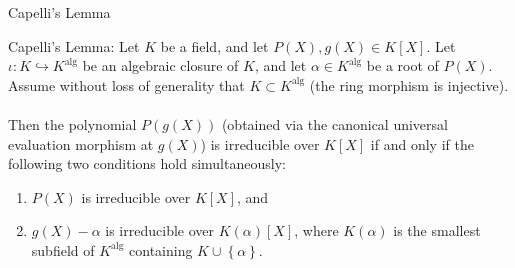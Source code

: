 \begin{appendixitem}{Capelli's Lemma}
    \begin{lemma}{Capelli's Lemma:}
        Let \( K \) be a field, and let \( P\left(X\right), g\left(X\right) \in K\left[X\right] \). Let \( \iota:K \hookrightarrow K^{\text{alg}} \) be an algebraic closure of \( K \), and let \( \alpha \in K^{\text{alg}} \) be a root of \( P\left(X\right) \). Assume without loss of generality that \( K\subset K^{\text{alg}} \) (the ring morphism is injective).
        \\\\
        Then the polynomial \( P\left( g\left(X\right) \right) \) (obtained via the canonical universal evaluation morphism at \( g\left(X\right) \)) is irreducible over \( K\left[X\right] \) if and only if the following two conditions hold simultaneously:
        \begin{enumerate}
            \item \( P\left(X\right) \) is irreducible over \( K\left[X\right] \), and
            \item \( g\left(X\right) - \alpha \) is irreducible over \( K\left(\alpha\right)\left[X\right] \), where \( K\left(\alpha\right) \) is the smallest subfield of \( K^{\text{alg}} \) containing \( K\cup\left\{\alpha\right\} \).
        \end{enumerate}
    \end{lemma}


\end{appendixitem}
